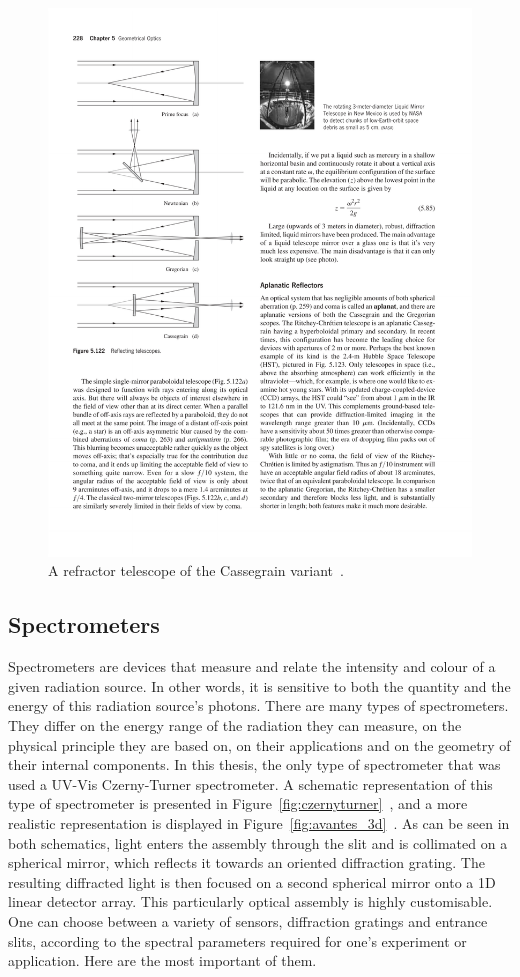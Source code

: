 \begin{figure}[htpb]
    \centering
    \includegraphics[clip,%
    trim=1cm 11.5cm 11cm 13.5cm,%
    width=.8\textwidth]{img/pdf/optics_reflector_telescopes_235.pdf}
    \caption{A refractor telescope of the Cassegrain
    variant~\cite{Hecht2016}.}\label{fig:reflector_telescopes}
\end{figure}


\subsection{Spectrometers}%
\label{sub:theobg_opticalsystems_spectrometers}

Spectrometers are devices that measure and relate the intensity and
colour of a given radiation source. In other words, it is sensitive to
both the quantity and the energy of this radiation source's photons.
There are many types of spectrometers. They differ on the energy range
of the radiation they can measure, on the physical principle they are
based on, on their applications and on the geometry of their internal
components. In this thesis, the only type of spectrometer that was used
a UV-Vis Czerny-Turner spectrometer. A schematic representation of this
type of spectrometer is presented in
Figure~\ref{fig:czernyturner}~\cite{Neumann2014}, and a more realistic
representation is displayed in
Figure~\ref{fig:avantes_3d}~\cite{Avantes2022}. As can be seen in both
schematics, light enters the assembly through the slit and is collimated
on a spherical mirror, which reflects it towards an oriented diffraction
grating. The resulting diffracted light is then focused on a second
spherical mirror onto a 1D linear detector array.  This particularly
optical assembly is highly customisable. One can choose between a
variety of sensors, diffraction gratings and entrance slits, according
to the spectral parameters required for one's experiment or application.
Here are the most important of them.

